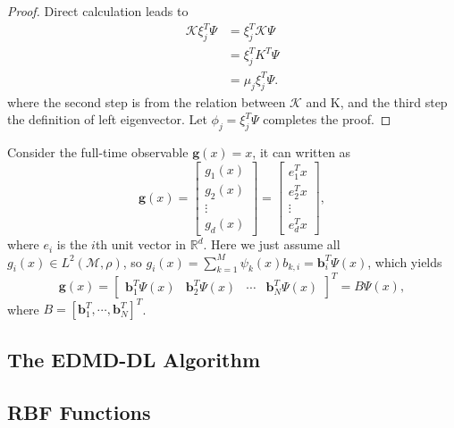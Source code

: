 \documentclass[en, bibend=bibtex]{elegantpaper}
\theoremstyle{plain}
\begin{document}
\begin{proof}
  Direct calculation leads to
  \begin{align*}
    \mathcal{K} \xi_j^T \Psi &= \xi_j^T \mathcal{K} \Psi\\
                             &= \xi_j^T K^T \Psi\\
                             &= \mu_j \xi_j^T \Psi.
  \end{align*}
  where the second step is from the relation between $\mathcal{K}$ and K,
  and the third step the definition of left eigenvector.
  Let $\phi_j = \xi_j^T \Psi$ completes the proof.
\end{proof}

Consider the full-time observable $\mathbf{g}(x) = x$,
it can written as
\begin{equation*}
  \mathbf{g}(x) = \left[
    \begin{array}{c}
      g_1(x)\\
      g_2(x)\\
      \vdots\\
      g_d(x)
    \end{array}
  \right] = \left[
    \begin{array}{c}
      e^T_1x\\
      e^T_2x\\
      \vdots\\
      e^T_dx
    \end{array}
  \right],
\end{equation*}
where $e_i$ is the $i$th unit vector in $\mathbb{R}^d$.
Here we just assume all $g_i(x) \in L^2(\mathcal{M}, \rho)$,
so $g_i(x) = \sum\limits_{k = 1}^M \psi_k(x) b_{k,i} = \mathbf{b}_i^T \Psi(x)$,
which yields
\begin{equation*}
  \mathbf{g}(x) = \left[
    \begin{array}{cccc}
      \mathbf{b}_1^T\Psi(x)&\mathbf{b}_2^T\Psi(x)&\cdots&\mathbf{b}_N^T\Psi(x)
    \end{array}
  \right]^T
  = B\Psi(x),
\end{equation*}
where $B = [\mathbf{b}_1^T,\cdots,\mathbf{b}_N^T]^T$.

\subsection{The EDMD-DL Algorithm}

\subsection{RBF Functions}
\end{document}
